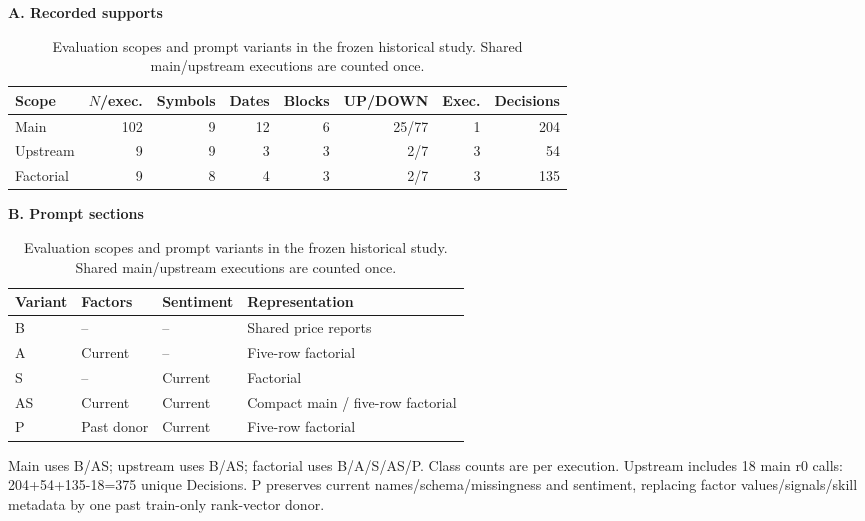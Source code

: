 \begin{table}[!htb]
\centering\small
\setlength{\tabcolsep}{3pt}
\renewcommand{\arraystretch}{1.15}
\caption{Evaluation scopes and prompt variants in the frozen historical study. Shared main/upstream executions are counted once.}
\label{tab:scope}
\textbf{A. Recorded supports}\par\smallskip
\begin{tabular}{lrrrrrrr}
\hline
Scope & $N$/exec. & Symbols & Dates & Blocks & UP/DOWN & Exec. & Decisions \\
\hline
Main & 102 & 9 & 12 & 6 & 25/77 & 1 & 204 \\
Upstream & 9 & 9 & 3 & 3 & 2/7 & 3 & 54 \\
Factorial & 9 & 8 & 4 & 3 & 2/7 & 3 & 135 \\
\hline
\end{tabular}\par\medskip
\textbf{B. Prompt sections}\par\smallskip
\begin{tabular}{llll}
\hline
Variant & Factors & Sentiment & Representation \\
\hline
B & -- & -- & Shared price reports \\
A & Current & -- & Five-row factorial \\
S & -- & Current & Factorial \\
AS & Current & Current & Compact main / five-row factorial \\
P & Past donor & Current & Five-row factorial \\
\hline
\end{tabular}\par\medskip
\begin{minipage}{\textwidth}\footnotesize Main uses B/AS; upstream uses B/AS; factorial uses B/A/S/AS/P. Class counts are per execution. Upstream includes 18 main r0 calls: 204+54+135-18=375 unique Decisions. P preserves current names/schema/missingness and sentiment, replacing factor values/signals/skill metadata by one past train-only rank-vector donor.\end{minipage}
\end{table}
